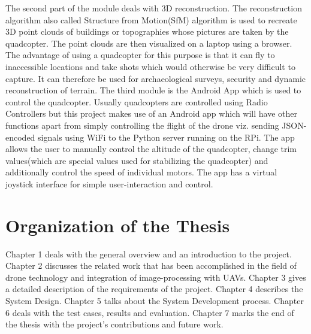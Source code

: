 \newline
\newline
The second part of the module deals with 3D reconstruction. The reconstruction algorithm also called Structure from Motion(SfM) algorithm is used to recreate 3D point clouds of buildings or topographies whose pictures are taken by the quadcopter. The point clouds are then visualized on a laptop using a browser. The advantage of using a quadcopter for this purpose is that it can fly to inaccessible locations and take shots which would otherwise be very difficult to capture. It can therefore be used for archaeological surveys, security and dynamic reconstruction of terrain.
\newline
\newline
The third module is the Android App which is used to control the quadcopter. Usually quadcopters are controlled using Radio Controllers but this project makes use of an Android app which will have other functions apart from simply controlling the flight of the drone viz. sending JSON-encoded signals using WiFi to the Python server running on the RPi. The app allows the user to manually control the altitude of the quadcopter, change trim values(which are special values used for stabilizing the quadcopter) and additionally control the speed of individual motors. The app has a virtual joystick interface for simple user-interaction and control.

\section{Organization of the Thesis} %
Chapter 1 deals with the general overview and an introduction to the project.
Chapter 2 discusses the related work that has been accomplished in the field of drone technology and integration of image-processing with UAVs.
Chapter 3 gives a detailed description of the requirements of the project.
Chapter 4 describes the System Design.
Chapter 5 talks about the System Development process.
Chapter 6 deals with the test cases, results and evaluation.
Chapter 7 marks the end of the thesis with the project's contributions and future work. 




